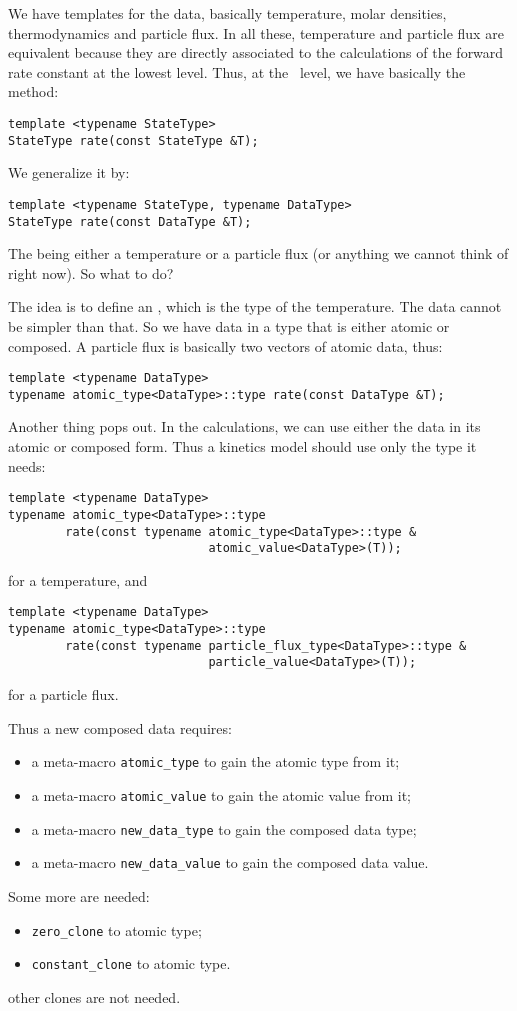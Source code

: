 We have templates for the data, basically temperature, molar
densities, thermodynamics and particle flux. In all these, temperature
and particle flux are equivalent because they are directly associated
to the calculations of the forward rate constant at the lowest level. 
Thus, at the \KineticsType\ level, we have basically the method:
\begin{verbatim}
template <typename StateType>
StateType rate(const StateType &T);
\end{verbatim}
We generalize it by:
\begin{verbatim}
template <typename StateType, typename DataType>
StateType rate(const DataType &T);
\end{verbatim}
The  being either a temperature or a particle flux (or anything we
cannot think of right now). So what to do?

The idea is to define an , which is the type of the temperature.
The data cannot be simpler than that. So we have data in a type that is either
atomic or composed. A particle flux is basically two vectors of atomic data, thus:
\begin{verbatim}
template <typename DataType>
typename atomic_type<DataType>::type rate(const DataType &T);
\end{verbatim}
Another thing pops out. In the calculations, we can use either the data in its atomic
or composed form. Thus a kinetics model should use only the type it needs:
\begin{verbatim}
template <typename DataType>
typename atomic_type<DataType>::type 
        rate(const typename atomic_type<DataType>::type &
                            atomic_value<DataType>(T));
\end{verbatim}
for a temperature, and 
\begin{verbatim}
template <typename DataType>
typename atomic_type<DataType>::type 
        rate(const typename particle_flux_type<DataType>::type &
                            particle_value<DataType>(T));
\end{verbatim}
for a particle flux.

Thus a new composed data requires:
\begin{itemize}
\item a meta-macro \verb!atomic_type!  to gain the atomic type from it;
\item a meta-macro \verb!atomic_value! to gain the atomic value from it;
\item a meta-macro \verb!new_data_type! to gain the composed data type;
\item a meta-macro \verb!new_data_value! to gain the composed data value.
\end{itemize}
Some more are needed:
\begin{itemize}
\item \verb!zero_clone! to atomic type;
\item \verb!constant_clone! to atomic type.
\end{itemize}
other clones are not needed.
